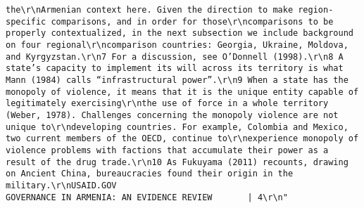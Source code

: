 \documentclass[
]{article}
\begin{document}
\begin{verbatim}
the\r\nArmenian context here. Given the direction to make region-specific comparisons, and in order for those\r\ncomparisons to be properly contextualized, in the next subsection we include background on four regional\r\ncomparison countries: Georgia, Ukraine, Moldova, and Kyrgyzstan.\r\n7 For a discussion, see O’Donnell (1998).\r\n8 A state’s capacity to implement its will across its territory is what Mann (1984) calls “infrastructural power”.\r\n9 When a state has the monopoly of violence, it means that it is the unique entity capable of legitimately exercising\r\nthe use of force in a whole territory (Weber, 1978). Challenges concerning the monopoly violence are not unique to\r\ndeveloping countries. For example, Colombia and Mexico, two current members of the OECD, continue to\r\nexperience monopoly of violence problems with factions that accumulate their power as a result of the drug trade.\r\n10 As Fukuyama (2011) recounts, drawing on Ancient China, bureaucracies found their origin in the military.\r\nUSAID.GOV                                                          GOVERNANCE IN ARMENIA: AN EVIDENCE REVIEW       | 4\r\n"                                                                                                                                                                                                                                                                                                                                                                                                                                                                                                                                                                                                 

\end{verbatim}
\end{document}
